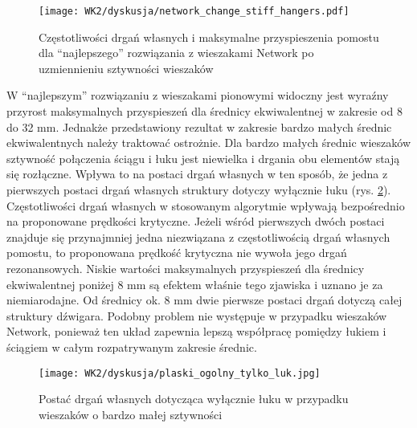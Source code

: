 \begin{figure}[hbt!]
	\centering
	\texttt{[image: WK2/dyskusja/network\_change\_stiff\_hangers.pdf]}
	\captionsetup{justification=centering}
	\caption{Częstotliwości drgań własnych i maksymalne przyspieszenia pomostu dla \enquote{najlepszego} rozwiązania z wieszakami Network po uzmiennieniu sztywności wieszaków}
	\label{fig:network_change_hangers_stiff}
\end{figure}

W \enquote{najlepszym} rozwiązaniu z wieszakami pionowymi widoczny jest wyraźny przyrost maksymalnych przyspieszeń dla średnicy ekwiwalentnej w zakresie od 8 do 32 mm. Jednakże przedstawiony rezultat w zakresie bardzo małych średnic ekwiwalentnych należy traktować ostrożnie. Dla bardzo małych średnic wieszaków sztywność połączenia ściągu i łuku jest niewielka i drgania obu elementów stają się rozłączne. Wpływa to na postaci drgań własnych w ten sposób, że jedna z pierwszych postaci drgań własnych struktury dotyczy wyłącznie łuku (rys. \ref{fig:small_stiff_hangers_mode_shape}). Częstotliwości drgań własnych w stosowanym algorytmie wpływają bezpośrednio na proponowane prędkości krytyczne. Jeżeli wśród pierwszych dwóch postaci znajduje się przynajmniej jedna niezwiązana z częstotliwością drgań własnych pomostu, to proponowana prędkość krytyczna nie wywoła jego drgań rezonansowych. Niskie wartości maksymalnych przyspieszeń dla średnicy ekwiwalentnej poniżej 8 mm są efektem właśnie tego zjawiska i uznano je za niemiarodajne. Od średnicy ok. 8 mm dwie pierwsze postaci drgań dotyczą całej struktury dźwigara. Podobny problem nie występuje w przypadku wieszaków Network, ponieważ ten układ zapewnia lepszą współpracę pomiędzy łukiem i ściągiem w całym rozpatrywanym zakresie średnic.

\begin{figure}[hbt!]
	\centering
	\texttt{[image: WK2/dyskusja/plaski\_ogolny\_tylko\_luk.jpg]}
	\captionsetup{justification=centering}
	\caption{Postać drgań własnych dotycząca wyłącznie łuku w przypadku wieszaków o bardzo małej sztywności}
	\label{fig:small_stiff_hangers_mode_shape}
\end{figure}


